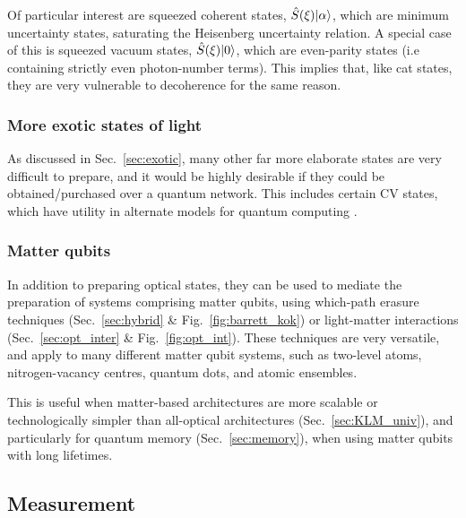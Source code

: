 Of particular interest are squeezed coherent states, $\hat{S}(\xi) |\alpha\rangle$, which are minimum uncertainty states, saturating the Heisenberg uncertainty relation. A special case of this is squeezed vacuum states, $\hat{S}(\xi) |0\rangle$, which are even-parity states (i.e containing strictly even photon-number terms). This implies that, like cat states, they are very vulnerable to decoherence for the same reason.

%
%

\subsubsection{More exotic states of light}

As discussed in Sec.~\ref{sec:exotic}, many other far more elaborate states are very difficult to prepare, and it would be highly desirable if they could be obtained/purchased over a quantum network. This includes certain CV states, which have utility in alternate models for quantum computing \cite{bib:Menicucci06, Ralph, Lund}.



%
%

\subsubsection{Matter qubits} 

In addition to preparing optical states, they can be used to mediate the preparation of systems comprising matter qubits, using which-path erasure techniques (Sec.~\ref{sec:hybrid} \& Fig.~\ref{fig:barrett_kok}) or light-matter interactions (Sec.~\ref{sec:opt_inter} \& Fig.~\ref{fig:opt_int}). These techniques are very versatile, and apply to many different matter qubit systems, such as two-level atoms, nitrogen-vacancy centres, quantum dots, and atomic ensembles.

This is useful when matter-based architectures are more scalable or technologically simpler than all-optical architectures (Sec.~\ref{sec:KLM_univ}), and particularly for quantum memory (Sec.~\ref{sec:memory}), when using matter qubits with long lifetimes.

%
%

\subsection{Measurement} 

